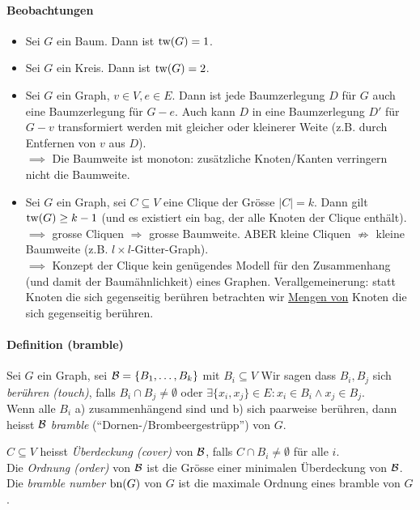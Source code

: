 \paragraph{Beobachtungen}
\begin{itemize}
    \item Sei $G$ ein Baum. Dann ist $\text{tw}(G) = 1$.
    \item Sei $G$ ein Kreis. Dann ist $\text{tw}(G) = 2$.
    \item Sei $G$ ein Graph, $v \in V, e \in E$.
    Dann ist jede Baumzerlegung $D$ für $G$ auch eine Baumzerlegung für $G-e$.
    Auch kann $D$ in eine Baumzerlegung $D'$ für $G-v$ transformiert werden mit gleicher oder kleinerer Weite
    (z.B. durch Entfernen von $v$ aus $D$).
    \\
    $\implies$ Die Baumweite ist monoton: zusätzliche Knoten/Kanten verringern nicht die Baumweite.
    \item Sei $G$ ein Graph, sei $C \subseteq V$ eine Clique der Grösse $|C| = k$.
    Dann gilt $\text{tw}(G) \geq k-1$ (und es existiert ein bag, der alle Knoten der Clique enthält).
    \\
    $\implies$ grosse Cliquen $\Rightarrow$ grosse Baumweite.
    ABER kleine Cliquen $\nRightarrow$ kleine Baumweite (z.B. $l \times l$-Gitter-Graph).
    \\
    $\implies$ Konzept der Clique kein genügendes Modell für den Zusammenhang
    (und damit der Baumähnlichkeit) eines Graphen.
    Verallgemeinerung: statt Knoten die sich gegenseitig berühren betrachten wir
    \underline{Mengen von} Knoten die sich gegenseitig berühren.
\end{itemize}

\paragraph{Definition (bramble)}
Sei $G$ ein Graph, sei $\mathcal{B} = \{B_1, \dots, B_k\}$ mit $B_i \subseteq V$
Wir sagen dass $B_i, B_j$ sich \emph{berühren (touch)}, falls
$B_i \cap B_j \neq \emptyset$ oder $\exists \{x_i, x_j\} \in E : x_i \in B_i \wedge x_j \in B_j$.
\\
Wenn alle $B_i$ a) zusammenhängend sind und b) sich paarweise berühren,
dann heisst $\mathcal{B}$ \emph{bramble} (``Dornen-/Brombeergestrüpp'') von $G$.

$C \subseteq V$ heisst \emph{Überdeckung (cover)} von $\mathcal{B}$, falls $C \cap B_i \neq \emptyset$ für alle $i$.
\\
Die \emph{Ordnung (order)} von $\mathcal{B}$ ist die Grösse einer minimalen Überdeckung von $\mathcal{B}$.
\\
Die \emph{bramble number} $\text{bn}(G)$ von $G$ ist die maximale Ordnung eines bramble von $G$.

